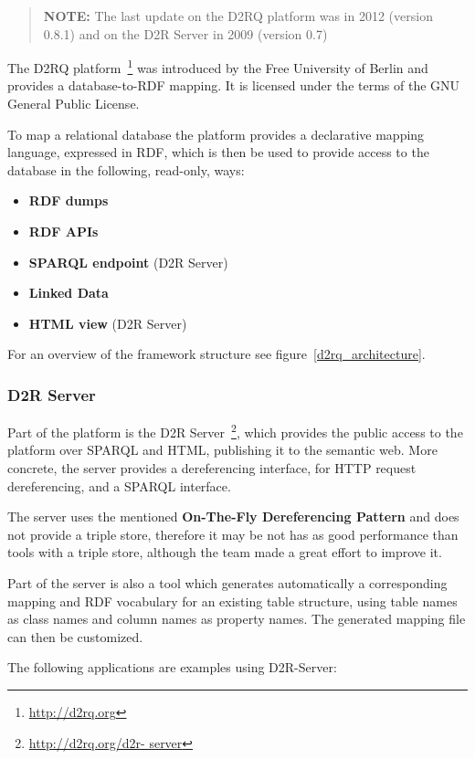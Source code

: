 \begin{verse}
\textbf{NOTE:} The last update on the D2RQ platform was in 2012 (version 0.8.1) 
and on the D2R Server in 2009 (version 0.7)
\end{verse}

The D2RQ platform~\footnote{\url{http://d2rq.org}} was introduced by the Free 
University of Berlin and provides a database-to-RDF mapping. It is licensed under 
the terms of the GNU General Public License. 

To map a relational database the platform provides a declarative mapping language, 
expressed in RDF, which is then be used to provide access to the database in the 
following, read-only, ways:~\cite{d2rq_w3c}

\begin{itemize}
\item \textbf{RDF dumps}
\item \textbf{RDF APIs}
\item \textbf{SPARQL endpoint} (D2R Server)
\item \textbf{Linked Data}
\item \textbf{HTML view} (D2R Server)
\end{itemize}

For an overview of the framework structure see figure~\ref{d2rq_architecture}.

\subsubsection{D2R Server}
Part of the platform is the D2R Server~\footnote{\url{http://d2rq.org/d2r-
server}}, which provides the public access to the platform over SPARQL and HTML, 
publishing it to the semantic web. More concrete, the server provides a 
dereferencing interface, for HTTP request dereferencing, and a SPARQL interface. 

The server uses the mentioned \textbf{On-The-Fly Dereferencing Pattern} and does 
not provide a triple store, therefore it may be not has as good performance than 
tools with a triple store, although the team made a great effort to improve it.

Part of the server is also a tool which generates automatically a corresponding 
mapping and RDF vocabulary for an existing table structure, using table names as 
class names and column names as property names. The generated mapping file can 
then be customized.~\cite{bizer2006d2r}

The following applications are examples using D2R-Server:

